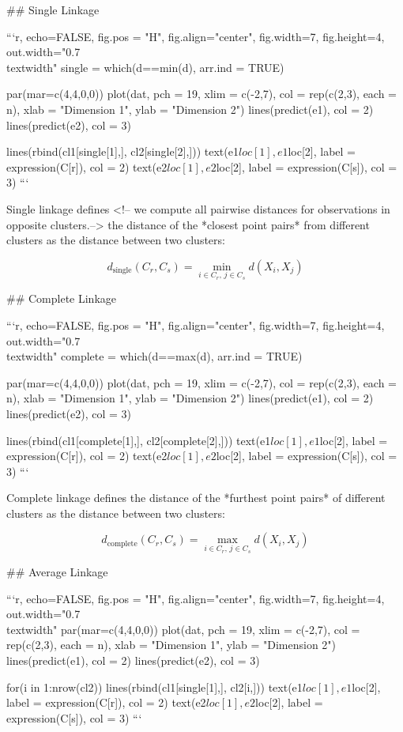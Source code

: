 ## Single Linkage

```{r, echo=FALSE, fig.pos = "H", fig.align="center", fig.width=7, fig.height=4, out.width="0.7\\textwidth"}
single = which(d==min(d), arr.ind = TRUE)

par(mar=c(4,4,0,0))
plot(dat, pch = 19, xlim = c(-2,7), col = rep(c(2,3), each = n),
  xlab = "Dimension 1", ylab = "Dimension 2")
lines(predict(e1), col = 2)
lines(predict(e2), col = 3)

lines(rbind(cl1[single[1],], cl2[single[2],]))
text(e1$loc[1], e1$loc[2], label = expression(C[r]), col = 2)
text(e2$loc[1], e2$loc[2], label = expression(C[s]), col = 3)
```

Single linkage defines <!-- we compute all pairwise distances for observations in
opposite clusters.--> the distance of the *closest point pairs* from different clusters as the distance between two clusters:

\[d_{\text{single}}(C_r,C_s) = \min_{i \in C_r, \, j \in C_s} d(X_i,X_j)\]

## Complete Linkage

```{r, echo=FALSE, fig.pos = "H", fig.align="center", fig.width=7, fig.height=4, out.width="0.7\\textwidth"}
complete = which(d==max(d), arr.ind = TRUE)

par(mar=c(4,4,0,0))
plot(dat, pch = 19, xlim = c(-2,7), col = rep(c(2,3), each = n),
  xlab = "Dimension 1", ylab = "Dimension 2")
lines(predict(e1), col = 2)
lines(predict(e2), col = 3)

lines(rbind(cl1[complete[1],], cl2[complete[2],]))
text(e1$loc[1], e1$loc[2], label = expression(C[r]), col = 2)
text(e2$loc[1], e2$loc[2], label = expression(C[s]), col = 3)
```

Complete linkage defines the distance of the *furthest point pairs* of different clusters as
the distance between two clusters:

\[d_{\text{complete}}(C_r,C_s) = \max_{i \in C_r, \, j \in C_s} d(X_i,X_j)\]

## Average Linkage

```{r, echo=FALSE, fig.pos = "H", fig.align="center", fig.width=7, fig.height=4, out.width="0.7\\textwidth"}
par(mar=c(4,4,0,0))
plot(dat, pch = 19, xlim = c(-2,7), col = rep(c(2,3), each = n),
  xlab = "Dimension 1", ylab = "Dimension 2")
lines(predict(e1), col = 2)
lines(predict(e2), col = 3)

for(i in 1:nrow(cl2)) lines(rbind(cl1[single[1],], cl2[i,]))
text(e1$loc[1], e1$loc[2], label = expression(C[r]), col = 2)
text(e2$loc[1], e2$loc[2], label = expression(C[s]), col = 3)
```

